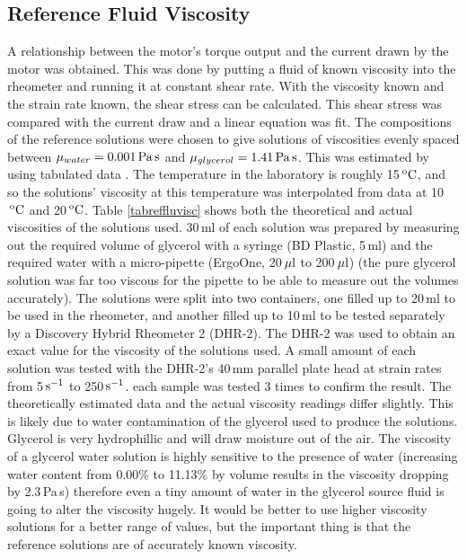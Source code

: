 \documentclass[twoside,a4]{report}
\def\br{\newline \newline \noindent}
\begin{document}
	\subsection*{Reference Fluid Viscosity}
	A relationship between the motor's torque output and the current drawn by the motor was obtained. This was done by putting a fluid of known viscosity into the rheometer and running it at constant shear rate. With the viscosity known and the strain rate known, the shear stress can be calculated. This shear stress was compared with the current draw and a linear equation was fit. 
	\br
	The compositions of the reference solutions were chosen to give solutions of viscosities evenly spaced between $\mu_{water} = 0.001\rm\,Pa\,s$ and $\mu_{glycerol} = 1.41\rm\,Pa\,s$. This was estimated by using tabulated data \cite{seguroberglycsolvisc}. The temperature in the laboratory is roughly 15$\,\rm^oC$, and so the solutions' viscosity at this temperature was interpolated from data at 10$\,\rm^oC$ and 20$\,\rm^oC$. Table \ref{tabreffluvisc} shows both the theoretical and actual viscosities of the solutions used. 30\,ml of each solution was prepared by measuring out the required volume of glycerol with a syringe (BD Plastic, 5\,ml) and the required water with a micro-pipette (ErgoOne, 20$\,\rm\mu l$ to 200$\,\rm\mu l$) (the pure glycerol solution was far too viscous for the pipette to be able to measure out the volumes accurately). The solutions were split into two containers, one filled up to 20\,ml to be used in the rheometer, and another filled up to 10\,ml to be tested separately by a Discovery Hybrid Rheometer 2 (DHR-2). 
	\br
	The DHR-2 was used to obtain an exact value for the viscosity of the solutions used. A small amount of each solution was tested with the DHR-2's 40\,mm parallel plate head at strain rates from 5$\,\rm s^{-1}$ to 250$\,\rm s^{-1}$. each sample was tested 3 times to confirm the result. The theoretically estimated data and the actual viscosity readings differ slightly. This is likely due to water contamination of the glycerol used to produce the solutions. Glycerol is very hydrophillic and will draw moisture out of the air. The viscosity of a glycerol water solution is highly sensitive to the presence of water (increasing water content from 0.00\% to 11.13\% by volume results in the viscosity dropping by 2.3\,Pa\,s) therefore even a tiny amount of water in the glycerol source fluid is going to alter the viscosity hugely. It would be better to use higher viscosity solutions for a better range of values, but the important thing is that the reference solutions are of accurately known viscosity. 
\end{document}
